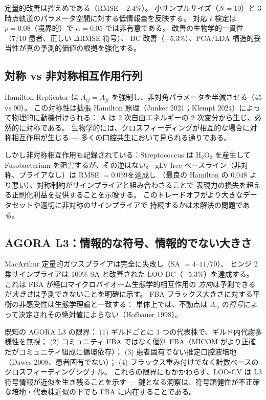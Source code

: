 \documentclass[11pt,a4paper]{article}
\newcommand{\bA}{\mathbf{A}}
\begin{document}
定量的改善は控えめである（RMSE $-2.4\%$）。
小サンプルサイズ（$N=10$）と 3 時点軌道のパラメータ空間に対する低情報量を反映する。
対応 $t$ 検定は $p=0.08$（境界的）で $\alpha=0.05$ では非有意である。
改善の生物学的一貫性（7/10 患者、正しい $\Delta$RMSE 符号）、
BC 改善（$-5.3\%$）、PCA/LDA 構造的妥当性が真の予測的価値の根拠を強化する。

\subsection{対称 vs 非対称相互作用行列}
\label{ssec:disc_sym}

Hamilton Replicator は $A_{ij}=A_{ji}$ を強制し、非対角パラメータを半減させる（45 vs 90）。
この対称性は拡張 Hamilton 原理（Junker 2021；Klempt 2024）によって物理的に動機付けられる：
$\bA$ は 2 次自由エネルギーの 2 次変分から生じ、必然的に対称である。
生物学的には、クロスフィーディングが相互的な場合に対称相互作用が生じる
--- 多くの口腔共生において見られる通りである。

しかし非対称相互作用も記録されている：Streptococcus は $\text{H}_2\text{O}_2$ を産生して
Fusobacterium を阻害するが、その逆はない。
gLV free ベースライン（非対称、プライアなし）は RMSE $= 0.059$を達成し
（最良の Hamilton の 0.048 より悪い）、対称制約がサインプライアと組み合わさることで
表現力の損失を超える正則化利益を提供することを示唆する。
このトレードオフがより大きなデータセットや適切に非対称のサインプライアで
持続するかは未解決の問題である。

\subsection{AGORA L3：情報的な符号、情報的でない大きさ}
\label{ssec:disc_agora}

MacArthur 定量的ガウスプライアは完全に失敗し（SA $= 4$--$11/70$）、
ヒンジ 2 乗サインプライアは 100\% SA と改善された LOO-BC（$-5.3\%$）を達成する。
これは FBA が経口マイクロバイオーム生態学的相互作用の
\emph{方向}は予測できるが\emph{大きさ}は予測できないことを明確に示す。
FBA フラックス大きさに対する平衡の非感受性は生態学理論と一致する：
単体上では、不動点は $A_{ij}$ の\emph{符号}によって決定されその絶対値によらない（Hofbauer 1998）。

既知の AGORA L3 の限界：
(1) ギルドごとに 1 つの代表株で、ギルド内代謝多様性を無視；
(2) コミュニティ FBA ではなく個別 FBA（MICOM がより正確だがコミュニティ組成に循環依存）；
(3) 患者固有でない推定口腔液培地（Dawes 2008、患者固有でない）；
(4) フラックス重み付けでなく計数ベースのクロスフィーディングシグナル。
これらの限界にもかかわらず、LOO-CV は L3 符号情報が近似を生き残ることを示す
--- 鍵となる洞察は、符号頑健性が不正確な培地・代表株近似の下でも FBA に内在することである。
\end{document}
